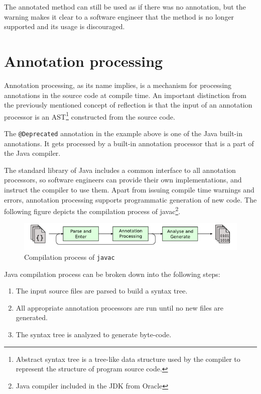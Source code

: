The annotated method can still be used as if there was no annotation, but the warning makes it clear to a software engineer that the method is no longer supported and its usage is discouraged.

\section{Annotation processing}
Annotation processing, as its name implies, is a mechanism for processing annotations in the source code at compile time.
An important distinction from the previously mentioned concept of reflection is that the input of an annotation processor is an AST\footnote{Abstract syntax tree is a tree-like data structure used by the compiler to represent the structure of program source code.} constructed from the source code.

\n

The \texttt{@Deprecated} annotation in the example above is one of the Java built-in annotations. It gets processed by a built-in annotation processor that is a part of the Java compiler.

\n

The standard library of Java includes a common interface to all annotation processors, so software engineers can provide their own implementations, and instruct the compiler to use them.
Apart from issuing compile time warnings and errors, annotation processing supports programmatic generation of new code.
The following figure depicts the compilation process of javac\footnote{Java compiler included in the JDK from Oracle}.

\begin{figure}[H]\centering
    \includegraphics[scale=0.8]{images/javac-flow.png}
    \caption[Compilation process of javac]{Compilation process of \texttt{javac}}\label{fig:javac-flow}
\end{figure}

Java compilation process can be broken down into the following steps:

\begin{enumerate}
    \item The input source files are parsed to build a syntax tree.
    \item All appropriate annotation processors are run until no new files are generated.
    \item The syntax tree is analyzed to generate byte-code.
\end{enumerate}

